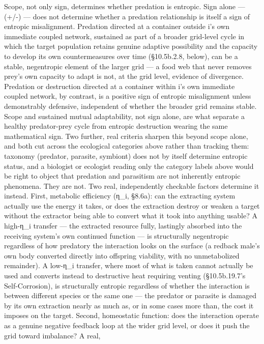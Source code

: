 \documentclass[
]{article}
\begin{document}
Scope, not only sign, determines whether predation is entropic. Sign
alone --- (+/-) --- does not determine whether a predation relationship
is itself a sign of entropic misalignment. Predation directed at a
container outside i's own immediate coupled network, sustained as part
of a broader grid-level cycle in which the target population retains
genuine adaptive possibility and the capacity to develop its own
countermeasures over time (§10.5b.2.8, below), can be a stable,
negentropic element of the larger grid --- a food web that never removes
prey's own capacity to adapt is not, at the grid level, evidence of
divergence. Predation or destruction directed at a container within i's
own immediate coupled network, by contrast, is a positive sign of
entropic misalignment unless demonstrably defensive, independent of
whether the broader grid remains stable. Scope and sustained mutual
adaptability, not sign alone, are what separate a healthy predator-prey
cycle from entropic destruction wearing the same mathematical sign. Two
further, real criteria sharpen this beyond scope alone, and both cut
across the ecological categories above rather than tracking them:
taxonomy (predator, parasite, symbiont) does not by itself determine
entropic status, and a biologist or ecologist reading only the category
labels above would be right to object that predation and parasitism are
not inherently entropic phenomena. They are not. Two real, independently
checkable factors determine it instead. First, metabolic efficiency
(η\_i, §8.6a): can the extracting system actually use the energy it
takes, or does the extraction destroy or weaken a target without the
extractor being able to convert what it took into anything usable? A
high-η\_i transfer --- the extracted resource fully, lastingly absorbed
into the receiving system's own continued function --- is structurally
negentropic regardless of how predatory the interaction looks on the
surface (a redback male's own body converted directly into offspring
viability, with no unmetabolized remainder). A low-η\_i transfer, where
most of what is taken cannot actually be used and converts instead to
destructive heat requiring venting (§10.5b.19.7's Self-Corrosion), is
structurally entropic regardless of whether the interaction is between
different species or the same one --- the predator or parasite is
damaged by its own extraction nearly as much as, or in some cases more
than, the cost it imposes on the target. Second, homeostatic function:
does the interaction operate as a genuine negative feedback loop at the
wider grid level, or does it push the grid toward imbalance? A real,
\end{document}
